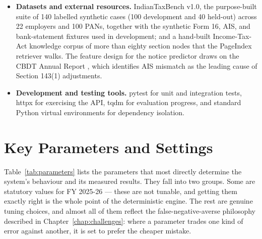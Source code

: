 \begin{itemize}
          generate the PDF CA-brief; plotly renders the dashboard visualisations
          --- the risk gauge, the reconciliation table, and the regime Sankey
          diagram --- in the Streamlit front-end.
    \item \textbf{Datasets and external resources.} IndianTaxBench v1.0, the
          purpose-built suite of 140 labelled synthetic cases (100 development
          and 40 held-out) across 22 employers and 100 PANs, together with the
          synthetic Form 16, AIS, and bank-statement fixtures used in
          development; and a hand-built Income-Tax-Act knowledge corpus of more
          than eighty section nodes that the PageIndex retriever walks. The
          feature design for the notice predictor draws on the CBDT Annual Report
          \cite{ref12}, which identifies AIS mismatch as the leading cause of
          Section 143(1) adjustments.
    \item \textbf{Development and testing tools.} pytest for unit and integration
          tests, httpx for exercising the API, tqdm for evaluation progress, and
          standard Python virtual environments for dependency isolation.
\end{itemize}

\section{Key Parameters and Settings}
\label{sec:parameters}

Table~\ref{tab:parameters} lists the parameters that most directly determine the
system's behaviour and its measured results. They fall into two groups. Some are
statutory values for FY 2025-26 --- these are not tunable, and getting them
exactly right is the whole point of the deterministic engine. The rest are
genuine tuning choices, and almost all of them reflect the false-negative-averse
philosophy described in Chapter~\ref{chap:challenges}: where a parameter trades
one kind of error against another, it is set to prefer the cheaper mistake.

